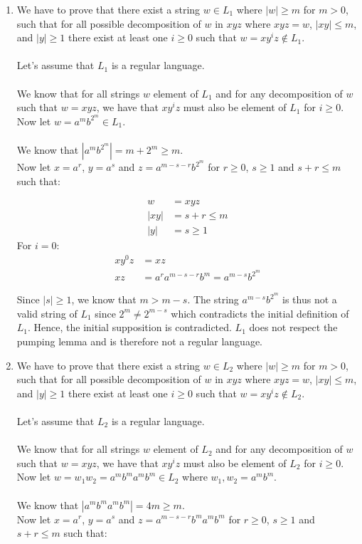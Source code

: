 \begin{enumerate}[label = (\alph*)]
    \item We have to prove that there exist a string $w \in L_1$ where $|w| \geq m$ for $m > 0$, such that for all possible decomposition of $w$ in $xyz$ where $xyz = w$, $|xy| \leq m$, and $|y| \geq 1$ there exist at least one $i \geq 0$ such that $w = xy^iz \notin L_1$.\\ \\
    Let's assume that $L_1$ is a regular language.\\ \\
    We  know that for all strings $w$ element of $L_1$ and for any decomposition of $w$ such that $w = xyz$, we have that $xy^iz$ must also be element of $L_1$ for $i \geq 0$.
    Now let $w = a^mb^{2^m} \in L_1$. \\ \\
    We know that $|a^mb^{2^m}| = m + 2^m \geq m$. \\
    Now let $x = a^r$, $y = a^s$ and $z = a^{m- s - r}b^{2^m}$ for $r \geq 0$, $s \geq 1$ and $s + r \leq m$ such that:
    
    \begin{align*}
                w &= xyz\\
                |xy| &= s + r \leq m\\ 
                |y| &= s \geq 1
            \end{align*}
            \noindent For $i = 0$:\\
            \begin{align*}
                xy^0z &= xz \\
                xz &= a^ra^{m-s-r}b^m = a^{m - s}b^{2^m}
            \end{align*}
            
    \noindent Since $|s| \geq 1$, we  know that $m > m - s$. The string $a^{m-s}b^{2^m}$ is thus not a valid string of $L_1$ since $2^m \neq 2^{m - s}$ which contradicts the initial definition of $L_1$. Hence, the initial supposition is contradicted. $L_1$ does not respect the pumping lemma and is therefore not a regular language.
    
    \item We have to prove that there exist a string $w \in L_2$ where $|w| \geq m$ for $m > 0$, such that for all possible decomposition of $w$ in $xyz$ where $xyz = w$, $|xy| \leq m$, and $|y| \geq 1$ there exist at least one $i \geq 0$ such that $w = xy^iz \notin L_2$.\\ \\
    Let's assume that $L_2$ is a regular language.\\ \\
    We  know that for all strings $w$ element of $L_2$ and for any decomposition of $w$ such that $w = xyz$, we have that $xy^iz$ must also be element of $L_2$ for $i \geq 0$.
    Now let $w = w_1w_2 = a^mb^ma^mb^m \in L_2$ where $w_1, w_2 = a^mb^m$. \\ \\
    We know that $|a^mb^ma^mb^m| = 4m \geq m$. \\
    Now let $x = a^r$, $y = a^s$ and $z = a^{m- s - r}b^ma^mb^m$ for $r \geq 0$, $s \geq 1$ and $s + r \leq m$ such that:
    

\end{enumerate}
